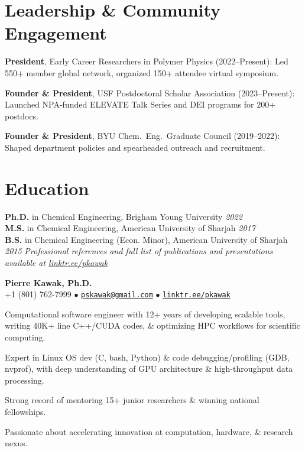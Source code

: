 \section*{Leadership \& Community Engagement}
\begin{tabitemize}[leftmargin=*]
  \item \textbf{President}, Early Career Researchers in Polymer Physics (2022–Present): Led 550+ member global network, organized 150+ attendee virtual symposium.
  \item \textbf{Founder \& President}, USF Postdoctoral Scholar Association (2023–Present): Launched NPA-funded ELEVATE Talk Series and DEI programs for 200+ postdocs.
  \item \textbf{Founder \& President}, BYU Chem.~Eng.~Graduate Council (2019–2022): Shaped department policies and spearheaded outreach and recruitment.
\end{tabitemize}
\vspace{-0.8\baselineskip}
\begin{refsection}[talks]
 \nocite{*}
 \setlength\bibitemsep{0pt}
 \printbibliography[resetnumbers=true,type=inproceedings,title={Selected Presentations},heading=fix]
\end{refsection}
\vspace{-1.0\baselineskip}
\section*{Education}
\textbf{Ph.D.} in Chemical Engineering, Brigham Young University \hfill \textit{2022} \\
\textbf{M.S.} in Chemical Engineering, American University of Sharjah \hfill \textit{2017} \\
\textbf{B.S.} in Chemical Engineering (Econ. Minor), American University of Sharjah \hfill \textit{2015}
\vspace{0.5em}
\noindent\textit{Professional references and full list of publications and presentations available at \href{https://linktr.ee/pkawak}{linktr.ee/pkawak}}

\begin{center}
  {\LARGE \textbf{Pierre Kawak, Ph.D.} }\\[1ex]
  +1 (801) 762-7999 $\bullet$ \href{mailto:pskawak@gmail.com}{\tt pskawak@gmail.com} $\bullet$ \href{https://linktr.ee/pkawak}{\tt linktr.ee/pkawak}\\
\end{center}
\begin{tabitemize}
  \item Computational software engineer with 12+ years of developing scalable tools, writing 40K+ line C++/CUDA codes, \& optimizing HPC workflows for scientific computing.
  \item Expert in Linux OS dev (C, bash, Python) \& code debugging/profiling (GDB, nvprof), with deep understanding of GPU architecture \& high-throughput data processing.
  \item Strong record of mentoring 15+ junior researchers \& winning national fellowships.
  \item Passionate about accelerating innovation at computation, hardware, \& research nexus.
\end{tabitemize}
\vspace{-2.0\baselineskip}
